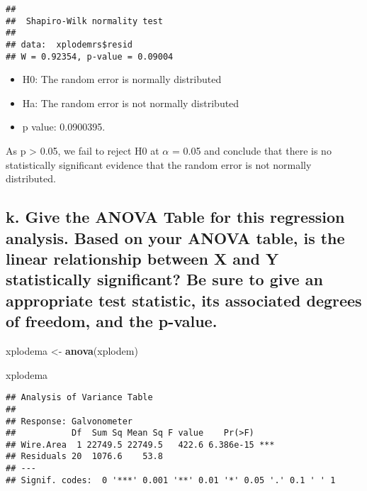 \documentclass[
]{article}
\newenvironment{Shaded}{\begin{snugshade}}{\end{snugshade}}
\newcommand{\FunctionTok}[1]{\textcolor[rgb]{0.13,0.29,0.53}{\textbf{#1}}}
\newcommand{\NormalTok}[1]{#1}
\newcommand{\OtherTok}[1]{\textcolor[rgb]{0.56,0.35,0.01}{#1}}
\begin{document}
\begin{verbatim}
## 
##  Shapiro-Wilk normality test
## 
## data:  xplodemrs$resid
## W = 0.92354, p-value = 0.09004
\end{verbatim}

\begin{itemize}
\item
  H0: The random error is normally distributed
\item
  Ha: The random error is not normally distributed
\item
  p value: 0.0900395.
\end{itemize}

As p \textgreater{} 0.05, we fail to reject H0 at \(\alpha\) = 0.05 and
conclude that there is no statistically significant evidence that the
random error is not normally distributed.

\hypertarget{k.-give-the-anova-table-for-this-regression-analysis.-based-on-your-anova-table-is-the-linear-relationship-between-x-and-y-statistically-significant-be-sure-to-give-an-appropriate-test-statistic-its-associated-degrees-of-freedom-and-the-p-value.}{%
\subsection{k. Give the ANOVA Table for this regression analysis. Based
on your ANOVA table, is the linear relationship between X and Y
statistically significant? Be sure to give an appropriate test
statistic, its associated degrees of freedom, and the
p-value.}\label{k.-give-the-anova-table-for-this-regression-analysis.-based-on-your-anova-table-is-the-linear-relationship-between-x-and-y-statistically-significant-be-sure-to-give-an-appropriate-test-statistic-its-associated-degrees-of-freedom-and-the-p-value.}}

\begin{Shaded}
\begin{Highlighting}[]
\NormalTok{xplodema }\OtherTok{\textless{}{-}} \FunctionTok{anova}\NormalTok{(xplodem)}

\NormalTok{xplodema}
\end{Highlighting}
\end{Shaded}

\begin{verbatim}
## Analysis of Variance Table
## 
## Response: Galvonometer
##           Df  Sum Sq Mean Sq F value    Pr(>F)    
## Wire.Area  1 22749.5 22749.5   422.6 6.386e-15 ***
## Residuals 20  1076.6    53.8                      
## ---
## Signif. codes:  0 '***' 0.001 '**' 0.01 '*' 0.05 '.' 0.1 ' ' 1
\end{verbatim}
\end{document}
